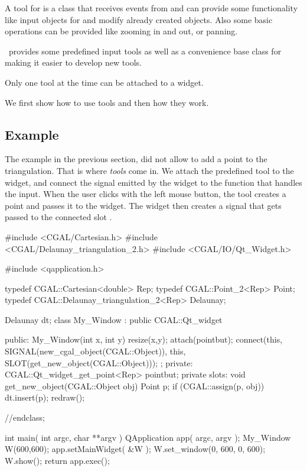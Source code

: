 A tool for  is a class that receives events from
 and can provide some functionality like input
objects for  and modify already created
objects. Also some basic operations can be provided like zooming in
and out, or panning.

\cgal\ provides some predefined input tools as well as a convenience base class 
 for making it easier to develop new tools.

Only one tool at the time can be attached to a widget.

We first show how to use tools and then how they work.

\subsection{Example}

The example in the previous section, did not allow to add a point to the triangulation.
That is where {\em  tools} come in. We attach the predefined tool 
to the widget, and connect the signal emitted by the widget to the function that 
handles the input.  When the user clicks with the left mouse button, the tool creates
a point and passes it to the widget. The widget then creates a signal that gets passed
to the connected slot .

\begin{ccExampleCode}
#include <CGAL/Cartesian.h>
#include <CGAL/Delaunay_triangulation_2.h>
#include <CGAL/IO/Qt_Widget.h>

#include <qapplication.h>

typedef CGAL::Cartesian<double>             Rep;
typedef CGAL::Point_2<Rep>                  Point;
typedef CGAL::Delaunay_triangulation_2<Rep> Delaunay;

Delaunay dt;
class My_Window : public CGAL::Qt_widget {
public:
  My_Window(int x, int y){
    resize(x,y);
    attach(pointbut);
    connect(this, SIGNAL(new_cgal_object(CGAL::Object)), 
            this, SLOT(get_new_object(CGAL::Object)));
  };
private:
  CGAL::Qt_widget_get_point<Rep> pointbut;   
private slots:
  void get_new_object(CGAL::Object obj)
  {
    Point p;
    if (CGAL::assign(p, obj)) { 
      dt.insert(p);
    }
    redraw();
  }

}//endclass;

int main( int argc, char **argv )
{
    QApplication app( argc, argv );
    My_Window W(600,600);
    app.setMainWidget( &W );
    W.set_window(0, 600, 0, 600);
    W.show();
    return app.exec();
}
\end{ccExampleCode}

